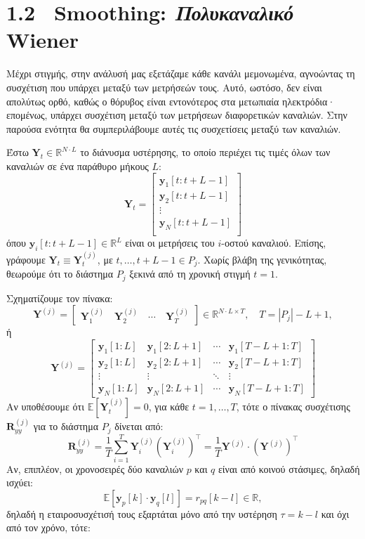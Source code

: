 \documentclass[12pt]{article} %
\begin{document}
\section*{1.2 \ Smoothing: \textit{Πολυκαναλικό} Wiener}
Μέχρι στιγμής, στην ανάλυσή μας εξετάζαμε κάθε κανάλι μεμονωμένα, αγνοώντας τη συσχέτιση που υπάρχει μεταξύ 
των μετρήσεών τους. Αυτό, ωστόσο, δεν είναι απολύτως ορθό, καθώς ο θόρυβος είναι εντονότερος στα μετωπιαία 
ηλεκτρόδια· επομένως, υπάρχει συσχέτιση μεταξύ των μετρήσεων διαφορετικών καναλιών. Στην παρούσα ενότητα θα 
συμπεριλάβουμε αυτές τις συσχετίσεις μεταξύ των καναλιών.

Έστω $\mathbf{Y}_t \in \mathbb{R}^{N \cdot L}$ το διάνυσμα υστέρησης, το οποίο περιέχει τις τιμές όλων των
καναλιών σε ένα παράθυρο μήκους $L$:
\[
\mathbf{Y}_t = 
\begin{bmatrix}
    \mathbf{y}_1[t:t+L-1] \\
    \mathbf{y}_2[t:t+L-1] \\
    \vdots \\
    \mathbf{y}_N[t:t+L-1] \\
\end{bmatrix}
\]
όπου $\mathbf{y}_i[t : t + L - 1] \in \mathbb{R}^L$ είναι οι μετρήσεις του $i$-οστού καναλιού.  
Επίσης, γράφουμε $\mathbf{Y}_t \equiv \mathbf{Y}_t^{(j)}$, με $t, \ldots, t + L - 1 \in P_j$.  
Χωρίς βλάβη της γενικότητας, θεωρούμε ότι το διάστημα $P_j$ ξεκινά από τη χρονική στιγμή $t = 1$.

Σχηματίζουμε τον πίνακα:
\[
\mathbf{Y}^{(j)} = 
\begin{bmatrix}
\mathbf{Y}_1^{(j)} \quad \mathbf{Y}_2^{(j)} \quad \cdots \quad \mathbf{Y}_T^{(j)}
\end{bmatrix}
\in \mathbb{R}^{N \cdot L \times T}, \quad T = |P_j| - L + 1,
\]
ή
\[
\mathbf{Y}^{(j)} = 
\begin{bmatrix}
    \mathbf{y}_1[1:L] & \mathbf{y}_1[2:L+1] & \cdots & \mathbf{y}_1[T-L+1:T] \\
    \mathbf{y}_2[1:L] & \mathbf{y}_2[2:L+1] & \cdots & \mathbf{y}_2[T-L+1:T] \\
    \vdots & \vdots & \ddots & \vdots \\
    \mathbf{y}_N[1:L] & \mathbf{y}_N[2:L+1] & \cdots & \mathbf{y}_N[T-L+1:T]
\end{bmatrix}
\]
Αν υποθέσουμε ότι $\mathbb{E}[\mathbf{Y}_t^{(j)}] = 0$, για κάθε $t = 1, \ldots, T$,  
τότε ο πίνακας συσχέτισης $\mathbf{R}_{yy}^{(j)}$ για το διάστημα $P_j$ δίνεται από:
\[
\mathbf{R}_{yy}^{(j)} = 
\frac{1}{T} \sum_{i=1}^T \mathbf{Y}_i^{(j)} \left(\mathbf{Y}_i^{(j)}\right)^{\top} = 
\frac{1}{T} \mathbf{Y}^{(j)} \cdot \left(\mathbf{Y}^{(j)}\right)^{\top}
\]
Αν, επιπλέον, οι χρονοσειρές δύο καναλιών $p$ και $q$ είναι από κοινού στάσιμες,  
δηλαδή ισχύει:
\[
\mathbb{E}[\mathbf{y}_p[k] \cdot \mathbf{y}_q[l]] = r_{pq}[k - l] \in \mathbb{R},
\]
δηλαδή η εταιροσυσχέτισή τους εξαρτάται μόνο από την υστέρηση $\tau = k - l$ και όχι από τον χρόνο, τότε:
\end{document}
